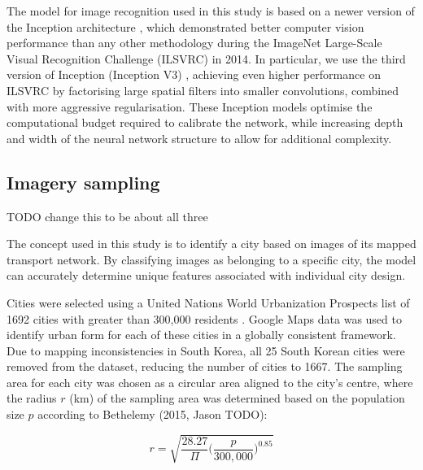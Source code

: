 \documentclass[final,3p,times,authoryear]{elsarticle}
\begin{document}
The model for image recognition used in this study is based on a newer version of the Inception architecture \citep{Szegedy2015}, which demonstrated better computer vision performance than any other methodology during the ImageNet Large-Scale Visual Recognition Challenge (ILSVRC) \citep{Russakovsky2015} in 2014. In particular, we use the third version of Inception (Inception V3) \citep{Szegedy2015a}, achieving even higher performance on ILSVRC by factorising large spatial filters into smaller convolutions, combined with more aggressive regularisation. These Inception models optimise the computational budget required to calibrate the network, while increasing depth and width of the neural network structure to allow for additional complexity.

\subsection{Imagery sampling}\label{sec:methods2}
TODO change this to be about all three

The concept used in this study is to identify a city based on images of its mapped transport network. By classifying images as belonging to a specific city, the model can accurately determine unique features associated with individual city design. 

Cities were selected using a United Nations World Urbanization Prospects list of 1692 cities with greater than 300,000 residents \citep{UN2014}. Google Maps data was used to identify urban form for each of these cities in a globally consistent framework. Due to mapping inconsistencies in South Korea, all 25 South Korean cities were removed from the dataset, reducing the number of cities to 1667. The sampling area for each city was chosen as a circular area aligned to the city's centre, where the radius $r$ (km) of the sampling area was determined based on the population size $p$ according to Bethelemy (2015, Jason TODO):

\begin{equation}
r = \sqrt{ \frac{28.27}{\Pi} \bigg( \frac{p}{300,000}  \bigg)^{0.85} }
\end{equation}
\end{document}
